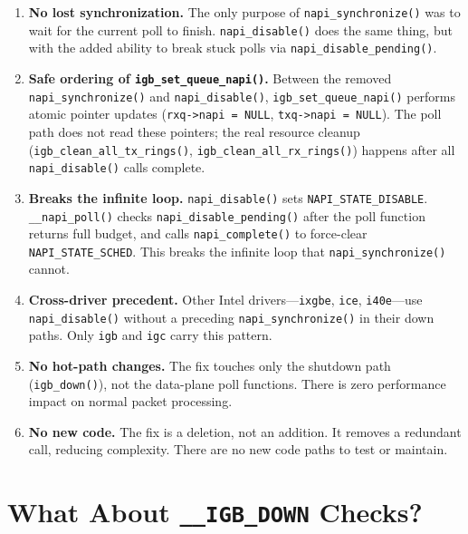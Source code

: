 \documentclass[11pt,a4paper,openany]{book}
\newcommand{\func}[1]{\texttt{#1()}}
\newcommand{\flag}[1]{\texttt{#1}}
\begin{document}
\begin{enumerate}
\item \textbf{No lost synchronization.}
    The only purpose of \func{napi\_synchronize} was to wait for the
    current poll to finish.  \func{napi\_disable} does the same thing,
    but with the added ability to break stuck polls via
    \func{napi\_disable\_pending}.

\item \textbf{Safe ordering of \func{igb\_set\_queue\_napi}.}
    Between the removed \func{napi\_synchronize} and
    \func{napi\_disable}, \func{igb\_set\_queue\_napi} performs atomic
    pointer updates (\texttt{rxq->napi = NULL},
    \texttt{txq->napi = NULL}).  The poll path does not read these
    pointers; the real resource cleanup (\func{igb\_clean\_all\_tx\_rings},
    \func{igb\_clean\_all\_rx\_rings}) happens after all
    \func{napi\_disable} calls complete.

\item \textbf{Breaks the infinite loop.}
    \func{napi\_disable} sets \flag{NAPI\_STATE\_DISABLE}.
    \func{\_\_napi\_poll} checks \func{napi\_disable\_pending} after
    the poll function returns full budget, and calls
    \func{napi\_complete} to force-clear \flag{NAPI\_STATE\_SCHED}.
    This breaks the infinite loop that \func{napi\_synchronize} cannot.

\item \textbf{Cross-driver precedent.}
    Other Intel drivers---\texttt{ixgbe}, \texttt{ice},
    \texttt{i40e}---use \func{napi\_disable} without a preceding
    \func{napi\_synchronize} in their down paths.  Only \texttt{igb}
    and \texttt{igc} carry this pattern.

\item \textbf{No hot-path changes.}
    The fix touches only the shutdown path (\func{igb\_down}), not the
    data-plane poll functions.  There is zero performance impact on
    normal packet processing.

\item \textbf{No new code.}
    The fix is a deletion, not an addition.  It removes a redundant
    call, reducing complexity.  There are no new code paths to test or
    maintain.
\end{enumerate}

\section{What About \texttt{\_\_IGB\_DOWN} Checks?}
\end{document}
